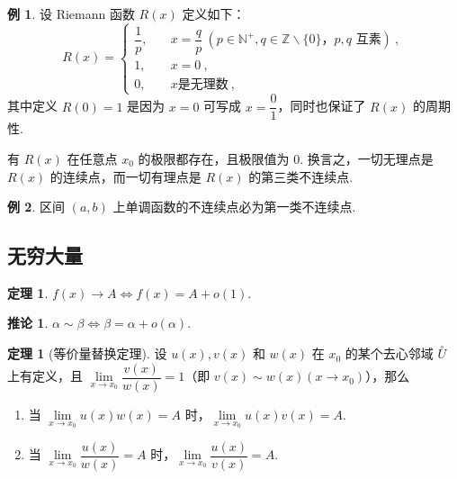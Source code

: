 \documentclass[zihao=-4,linespread=1.8,UTF8,nothm]{aytony_base}
\theoremstyle{definition}
\newtheorem*{theorem*}{\indent\heiti\textbf{定理}}
\newtheorem{theorem}{\indent\heiti\textbf{定理}}[subsection]
\newtheorem*{corollary}{\indent\heiti\textbf{推论}}
\newtheorem{example}{\indent\heiti\textbf{例}}[subsection]
\begin{document}
\setcounter{example}{6}
\begin{example}
    设 Riemann 函数 $R(x)$ 定义如下：$$
        R(x) = \left\{
        \begin{aligned}
            \dfrac{1}{p}, & \quad x = \dfrac{q}{p}\ (\text{$p \in \mathbb{N}^+,q\in \mathbb{Z} \backslash \{0\}$，$p, q$ 互素})\ , \\
            1,            & \quad  x = 0\ ,                                                                                        \\
            0,            & \quad  x \text{是无理数}\ ,
        \end{aligned}
        \right.
    $$ 其中定义 $R(0) = 1$ 是因为 $x = 0$ 可写成 $x = \dfrac{0}{1}$，同时也保证了 $R(x)$ 的周期性.

    有 $R(x)$ 在任意点 $x_0$ 的极限都存在，且极限值为 $0$. 换言之，一切无理点是 $R(x)$ 的连续点，而一切有理点是 $R(x)$ 的第三类不连续点.
\end{example}

\begin{example}
    区间 $(a, b)$ 上单调函数的不连续点必为第一类不连续点.
\end{example}

\subsection{无穷大量}

\begin{theorem*}
    $f(x) \to A \Leftrightarrow f(x) = A + o(1)$.
\end{theorem*}

\begin{corollary}
    $\alpha \sim \beta \Leftrightarrow \beta = \alpha + o(\alpha)$.
\end{corollary}

\begin{theorem}[等价量替换定理]
    设 $u(x), v(x)$ 和 $w(x)$ 在 $x_0$ 的某个去心邻域 $\overset{\circ}{U}$ 上有定义，且 $\lim\limits_{x \to x_0} \dfrac{v(x)}{w(x)} = 1$（即 $v(x) \sim w(x)(x \to x_0)$），那么
    \begin{enumerate}
        \item 当 $\lim\limits_{x \to x_0} u(x)w(x) = A$ 时，$\lim\limits_{x \to x_0} u(x)v(x) = A$.
        \item 当 $\lim\limits_{x \to x_0} \dfrac{u(x)}{w(x)} = A$ 时，$\lim\limits_{x \to x_0} \dfrac{u(x)}{v(x)} = A$.
    \end{enumerate}
\end{theorem}
\end{document}
